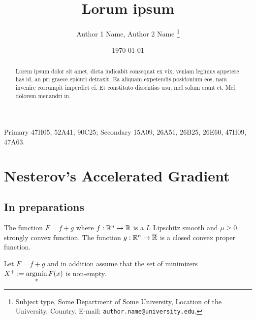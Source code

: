 \documentclass[12pt]{article}
\begin{document}
\title{{\selectfont Lorum ipsum}}

\author{
    Author 1 Name, Author 2 Name
    \thanks{
        Subject type, Some Department of Some University, Location of the University,
        Country. E-mail: \texttt{author.name@university.edu}.
    }
}

\date{\today}

\maketitle
{}

\begin{abstract} 
    \noindent
    Lorem ipsum dolor sit amet, dicta iudicabit consequat ex vix, veniam legimus appetere has id, an pri graece epicuri detraxit. Ea aliquam expetendis posidonium eos, nam invenire corrumpit imperdiet ei. Et constituto dissentias usu, mel solum erant et. Mel dolorem menandri in.
    \cite{nesterov_lectures_2018}
\end{abstract}

Primary 47H05, 52A41, 90C25; Secondary 15A09, 26A51, 26B25, 26E60, 47H09, 47A63.


\section{Nesterov's Accelerated Gradient}
    \subsection{In preparations}
        \begin{assumption}\label{ass:smooth-plus-nonsmooth}
            The function $F = f + g$ where $f:\mathbb R^n \rightarrow \mathbb R$ is a $L$ Lipschitz smooth and $\mu \ge 0$ strongly convex function. 
            The function $g:\mathbb R^n \rightarrow \overline {\mathbb R}$ is a closed convex proper function. 
        \end{assumption}
        \begin{assumption}\label{ass:smooth-plus-nonsmooth-x}
            Let $F = f + g$ and in addition assume that the set of minimizers $X^+ := \mathop{\rm argmin}\limits_{x}F(x)$ is non-empty. 
        \end{assumption}
\end{document}
